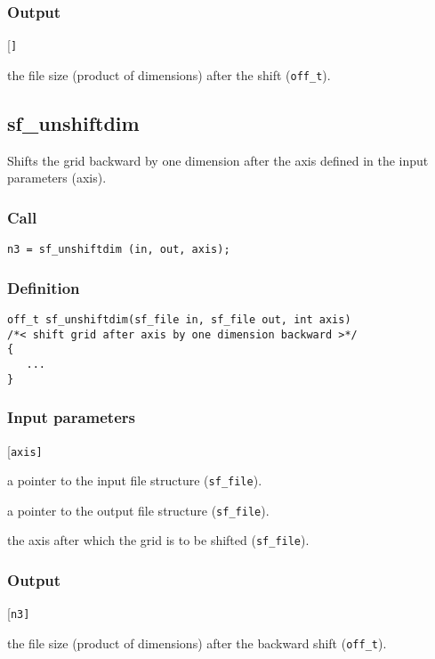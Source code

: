 \subsubsection*{Output}
\begin{desclist}{\tt }{\quad}[\tt ]
   \setlength\itemsep{0pt}
   \item[n3] the file size (product of dimensions) after the shift (\texttt{off\_t}).
\end{desclist}




\subsection{{sf\_unshiftdim}}
Shifts the grid backward by one dimension after the axis defined in the input parameters (axis). 

\subsubsection*{Call}
\begin{verbatim}n3 = sf_unshiftdim (in, out, axis);\end{verbatim}

\subsubsection*{Definition}
\begin{verbatim}
off_t sf_unshiftdim(sf_file in, sf_file out, int axis) 
/*< shift grid after axis by one dimension backward >*/
{
   ...
}
\end{verbatim}

\subsubsection*{Input parameters}
\begin{desclist}{\tt }{\quad}[\tt axis]
   \setlength\itemsep{0pt}
   \item[in]   a pointer to the input file structure (\texttt{sf\_file}). 
   \item[out]  a pointer to the output file structure (\texttt{sf\_file}). 
   \item[axis] the axis after which the grid is to be shifted (\texttt{sf\_file}).
\end{desclist}

\subsubsection*{Output}
\begin{desclist}{\tt }{\quad}[\tt n3]
   \setlength\itemsep{0pt}
   \item[n3] the file size (product of dimensions) after the backward shift (\texttt{off\_t}).
\end{desclist}




